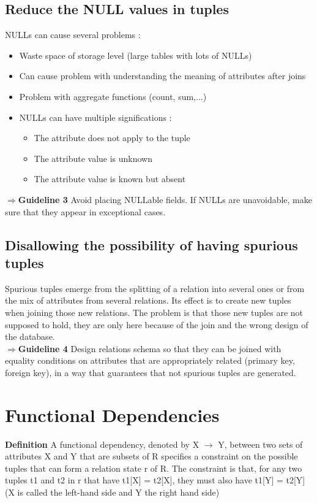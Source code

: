 \subsection{Reduce the NULL values in tuples}
NULLs can cause several problems :
\begin{itemize}
    \item Waste space of storage level (large tables with lots of NULLs)
    \item Can cause problem with understanding the meaning of attributes after joins
    \item Problem with aggregate functions (count, sum,...)
    \item NULLs can have multiple significations :
    \begin{itemize}
        \item The attribute does not apply to the tuple
        \item The attribute value is unknown
        \item The attribute value is known but absent
    \end{itemize}
\end{itemize}
$\Rightarrow$\textbf{Guideline 3 } Avoid placing NULLable fields. If NULLs are unavoidable, make sure that they appear in exceptional cases.

\subsection{Disallowing the possibility of having spurious tuples}

Spurious tuples emerge from the splitting of a relation into several ones or from the mix of attributes from several relations. Its effect is to create new tuples when joining those new relations. The problem is that those new tuples are not supposed to hold, they are only here because of the join and the wrong design of the database.\\

$\Rightarrow$\textbf{Guideline 4 } Design relations schema so that they can be joined with equality conditions on attributes that are appropriately related (primary key, foreign key), in a way that guarantees that not spurious tuples are generated.

\section{Functional Dependencies}
\textbf{Definition} A functional dependency, denoted by X $\rightarrow$ Y, between two sets of attributes X and Y that are subsets of R specifies a constraint on the possible tuples that can form a relation state r of R. The constraint is that, for any two tuples t1 and t2 in r that have t1[X] = t2[X], they must also have t1[Y] = t2[Y] (X is called the left-hand side and Y the right hand side)\\

